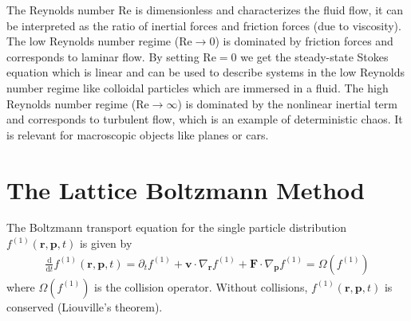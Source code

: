 \documentclass[a4paper,10pt,bibtotoc]{scrartcl}
\begin{document}
The Reynolds number Re is dimensionless and characterizes the fluid flow, it can be interpreted as the ratio of inertial forces and friction forces (due to viscosity). The low Reynolds number regime ($\mathrm{Re}\rightarrow 0$) is dominated by friction forces and corresponds to laminar flow. By setting $\mathrm{Re}= 0$ we get the steady-state Stokes equation which is linear and can be used to describe systems in the low Reynolds number regime like colloidal particles which are immersed in a fluid. The high Reynolds number regime ($\mathrm{Re}\rightarrow \infty$) is dominated by the nonlinear inertial term and corresponds to turbulent flow, which is an example of deterministic chaos. It is relevant for macroscopic objects like planes or cars.


\section{The Lattice Boltzmann Method}
The Boltzmann transport equation for the single particle distribution $f^{(1)}(\mathbf{r},\mathbf{p},t)$ is given by
\begin{align}
 \frac{\mathrm{d}}{\mathrm{d}t}f^{(1)}(\mathbf{r},\mathbf{p},t) = \partial_t f^{(1)} + \mathbf{v}\cdot\nabla_\mathbf{r}f^{(1)} + \mathbf{F}\cdot\nabla_\mathbf{p}f^{(1)} = \Omega (f^{(1)})
\end{align}
where $\Omega (f^{(1)})$ is the collision operator. Without collisions, $f^{(1)}(\mathbf{r},\mathbf{p},t)$ is conserved (Liouville's theorem).
\end{document}
